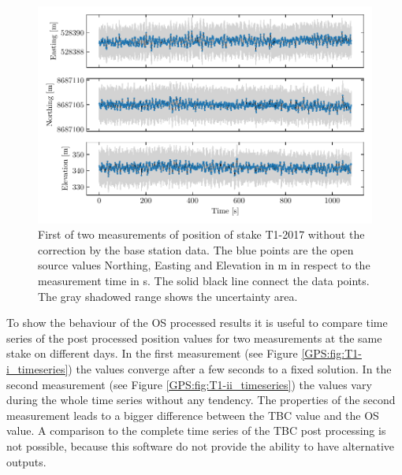 \begin{figure}[H]
    \centering
    \includegraphics[width=\textwidth]{./figs/timeseries/46250700_org-T1-i-2017_Timeseries-east-north-elev.pdf}
    \caption{First of two measurements of position of stake T1-2017 without the correction by the base station data. The blue points are the open source values Northing, Easting and Elevation in m in respect to the measurement time in s. The solid black line connect the data points. The gray shadowed range shows the uncertainty area.}
    \label{GPS:fig:T1-i_nocorr}
\end{figure}

To show the behaviour of the OS processed results it is useful to compare time series of the post processed position values for two measurements at the same stake on different days.
In the first measurement (see Figure \ref{GPS:fig:T1-i_timeseries}) the values converge after a few seconds to a fixed solution.
In the second measurement (see Figure \ref{GPS:fig:T1-ii_timeseries}) the values vary during the whole time series without any tendency.
The properties of the second measurement leads to a bigger difference between the TBC value and the OS value.
A comparison to the complete time series of the TBC post processing is not possible, because this software do not provide the ability to have alternative outputs.

